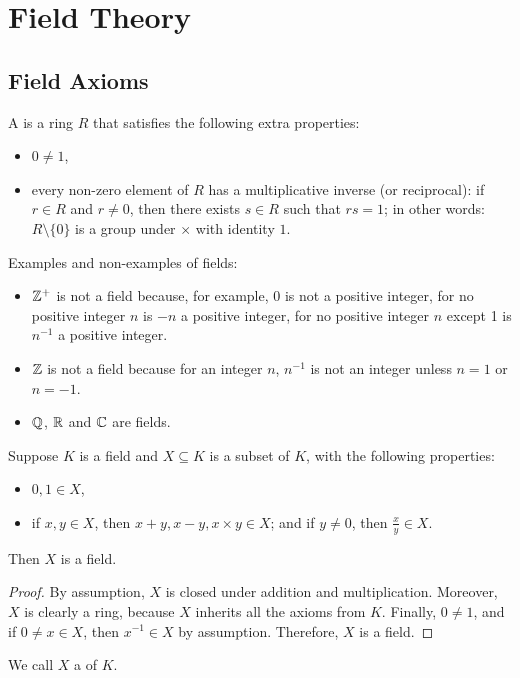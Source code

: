 \chapter{Field Theory}
\section{Field Axioms}
\begin{definition}
A  is a ring $R$ that satisfies the following extra properties:
\begin{itemize}
\item $0 \neq 1$,
\item every non-zero element of $R$ has a multiplicative inverse (or reciprocal): if $r \in R$ and $r \neq 0$, then there exists $s \in R$ such that $rs=1$; in other words: $R \setminus\{0\}$ is a group under $\times$ with identity $1$.
\end{itemize}
\end{definition}

\begin{example}
Examples and non-examples of fields:
\begin{itemize}
\item $\mathbb Z^+$ is not a field because, for example, 0 is not a positive integer, for no positive integer $n$ is $-n$ a positive integer, for no positive integer $n$ except 1 is $n^{-1}$ a positive integer.
\item $\mathbb Z$ is not a field because for an integer $n$, $n^{-1}$ is not an integer unless $n=1$ or $n=-1$.
\item $\mathbb Q$, $\mathbb R$ and $\mathbb C$ are fields.
\end{itemize}
\end{example}

\begin{proposition}
Suppose $K$ is a field and $X \subseteq K$ is a subset of $K$, with the following properties:
\begin{itemize}
\item $0, 1 \in X$,
\item if $x, y \in X$, then $x+y, x-y, x \times y \in X$; and if $y \neq 0$, then $\frac{x}{y} \in X$.
\end{itemize}
Then $X$ is a field.
\end{proposition}
\begin{proof}
By assumption, $X$ is closed under addition and multiplication. Moreover, $X$ is clearly a ring, because $X$ inherits all the axioms from $K$. Finally, $0 \neq 1$, and if $0 \neq x \in X$, then $x^{-1} \in X$ by assumption. Therefore, $X$ is a field.
\end{proof}
We call $X$ a  of $K$.

